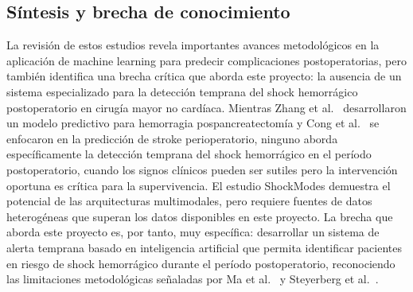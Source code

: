 \subsection{Síntesis y brecha de conocimiento}

La revisión de estos estudios revela importantes avances metodológicos en la aplicación de machine learning para predecir complicaciones postoperatorias, pero también identifica una brecha crítica que aborda este proyecto: la ausencia de un sistema especializado para la detección temprana del shock hemorrágico postoperatorio en cirugía mayor no cardíaca. Mientras Zhang et al.\ \cite{zhang2025} desarrollaron un modelo predictivo para hemorragia pospancreatectomía y Cong et al.\ \cite{cong2025} se enfocaron en la predicción de stroke perioperatorio, ninguno aborda específicamente la detección temprana del shock hemorrágico en el período postoperatorio, cuando los signos clínicos pueden ser sutiles pero la intervención oportuna es crítica para la supervivencia. El estudio ShockModes \cite{pal2022} demuestra el potencial de las arquitecturas multimodales, pero requiere fuentes de datos heterogéneas que superan los datos disponibles en este proyecto. La brecha que aborda este proyecto es, por tanto, muy específica: desarrollar un sistema de alerta temprana basado en inteligencia artificial que permita identificar pacientes en riesgo de shock hemorrágico durante el período postoperatorio, reconociendo las limitaciones metodológicas señaladas por Ma et al.\ \cite{ma2023} y Steyerberg et al.\ \cite{steyerberg2018}.

